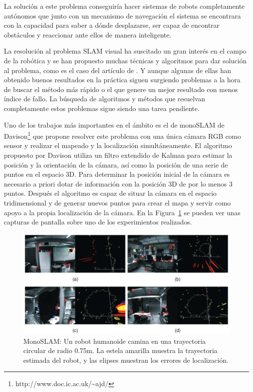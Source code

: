 La solución a este problema conseguiría hacer sistemas de robots completamente autónomos que junto con un mecanismo de navegación el sistema se encontrara con la capacidad para saber a dónde desplazarse, ser capaz de encontrar obstáculos y reaccionar ante ellos de manera inteligente.

La resolución al problema SLAM visual ha suscitado un gran interés en el campo de la robótica y se han propuesto muchas técnicas y algoritmos para dar solución al problema, como es el caso del artículo de \cite{Reference1}. Y aunque algunas de ellas han obtenido buenos resultados en la práctica siguen surgiendo problemas a la hora de buscar el método más rápido o el que genere un mejor resultado con menos índice de fallo. La búsqueda de algoritmos y métodos que resuelvan completamente estos problemas sigue siendo una tarea pendiente.

Uno de los trabajos más importantes en el ámbito es el de monoSLAM de Davison\footnote{http://www.doc.ic.ac.uk/\textasciitilde ajd/} \parencite{Reference5} que propone resolver este problema con una única cámara RGB como sensor y realizar el mapeado y la localización simultáneamente. El algoritmo propuesto por Davison utiliza un filtro extendido de Kalman para estimar la posición y la orientación de la cámara, así como la posición de una serie de puntos en el espacio 3D. Para determinar la posición inicial de la cámara es necesario a priori dotar de información con la posición 3D de por lo menos 3 puntos. Después el algoritmo es capaz de situar la cámara en el espacio tridimensional y de generar nuevos puntos para crear el mapa y servir como apoyo a la propia localización de la cámara. En la Figura~\ref{fig:Monoslam} se pueden ver unas capturas de pantalla sobre uno de los experimientos realizados.

\begin{figure}[th]
\centering
\includegraphics[scale=0.35]{Figures/monoslam.png}
\decoRule
\caption[MonoSLAM]{MonoSLAM: Un robot humanoide camina en una trayectoria circular de radio 0.75m. La estela amarilla muestra la trayectoria estimada del robot, y las elipses muestran los errores de localización.}
\label{fig:Monoslam}
\end{figure}

